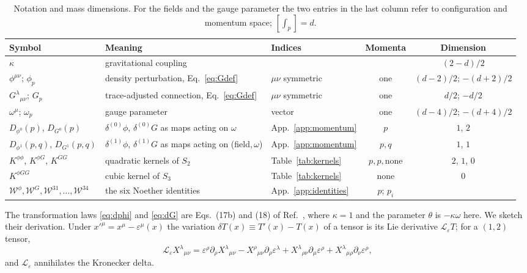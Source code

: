 \documentclass[prd,aps,preprint,superscriptaddress,nofootinbib,amsmath,amssymb,eqsecnum]{revtex4-2}
\newcommand{\W}{\mathcal{W}}
\newcommand{\ip}[1]{\int_{#1}}
\providecommand{\DIFaddtex}[1]{{\protect\color{blue} \sf #1}} %
\providecommand{\DIFdeltex}[1]{{\protect\color{red} \scriptsize #1}} %
\providecommand{\DIFaddFL}[1]{\DIFadd{#1}} %
\providecommand{\DIFdelFL}[1]{\DIFdel{#1}} %
\providecommand{\DIFaddbeginFL}{} %
\providecommand{\DIFaddendFL}{} %
\providecommand{\DIFdelbeginFL}{} %
\providecommand{\DIFdelendFL}{} %
\providecommand{\DIFadd}[1]{\texorpdfstring{\DIFaddtex{#1}}{#1}} %
\providecommand{\DIFdel}[1]{\texorpdfstring{\DIFdeltex{#1}}{}} %
\begin{document}
\begin{table}[htb]
\centering\scriptsize
\setlength{\tabcolsep}{9pt}
\begin{tabular}{@{}lllcc@{}}
\toprule
Symbol & Meaning & Indices & Momenta & Dimension \\
\midrule
$\kappa$ & gravitational coupling & & & $(2-d)/2$ \\
$\phi^{\mu\nu}$; $\phi_p$ & density perturbation, Eq.~\eqref{eq:Gdef} & $\mu\nu$ symmetric & one & $(d-2)/2$; $-(d+2)/2$ \\
$G^{\lambda}{}_{\mu\nu}$; $G_p$ & trace-adjusted connection, Eq.~\eqref{eq:Gdef} & $\mu\nu$ symmetric & one & $d/2$; $-d/2$ \\
$\omega^{\mu}$; $\omega_p$ & gauge parameter & vector & one & $(d-4)/2$; $-(d+4)/2$ \\
$D_{\phi^0}(p)$, $D_{G^0}(p)$ & $\delta^{(0)}\phi$, $\delta^{(0)}G$ \DIFdelbeginFL \DIFdelFL{as maps }\DIFdelendFL \DIFaddbeginFL \DIFaddFL{acting }\DIFaddendFL on $\omega$ & App.~\ref{app:momentum} & $p$ & $1$, $2$ \\
$D_{\phi^1}(p,q)$, $D_{G^1}(p,q)$ & $\delta^{(1)}\phi$, $\delta^{(1)}G$ \DIFdelbeginFL \DIFdelFL{as maps }\DIFdelendFL \DIFaddbeginFL \DIFaddFL{acting }\DIFaddendFL on (field,\,$\omega$) & App.~\ref{app:momentum} & $p,q$ & $1$, $1$ \\
$K^{\phi\phi}$, $K^{\phi G}$, $K^{GG}$ & quadratic kernels of $S_2$ & Table~\ref{tab:kernels} & $p,p,\text{none}$ & $2$, $1$, $0$ \\
$K^{\phi GG}$ & cubic kernel of $S_3$ & Table~\ref{tab:kernels} & none & $0$ \\
$\W^{\phi},\W^{G},\W^{31},\dots,\W^{34}$ & the six Noether identities & App.~\ref{app:identities} & $p$; $p_i$ & \\
\bottomrule
\end{tabular}
\caption{Notation and mass dimensions. For the fields and the gauge parameter the two entries
in the last column refer to configuration and momentum space; $[\ip{p}]=d$.}
\label{tab:notation}
\end{table}

The transformation laws \eqref{eq:dphi} and \eqref{eq:dG} are Eqs.~(17b) and (18) of
Ref.~\cite{BrandtMcKeon2015}, where $\kappa=1$ and the parameter $\theta$ is $-\kappa\omega$
here. We sketch their derivation. Under $x'^\mu=x^\mu-\varepsilon^\mu(x)$ the variation
$\delta T(x)\equiv T'(x)-T(x)$ of a tensor is its Lie derivative $\mathcal{L}_\varepsilon T$;
for a $(1,2)$ tensor,
\begin{equation}
\mathcal{L}_\varepsilon X^{\lambda}{}_{\mu\nu}=\varepsilon^\rho\partial_\rho X^{\lambda}{}_{\mu\nu}
-X^{\rho}{}_{\mu\nu}\partial_\rho\varepsilon^\lambda
+X^{\lambda}{}_{\rho\nu}\partial_\mu\varepsilon^\rho
+X^{\lambda}{}_{\mu\rho}\partial_\nu\varepsilon^\rho ,
\label{eq:lie12}
\end{equation}
and $\mathcal{L}_\varepsilon$ annihilates the Kronecker delta.
\end{document}
